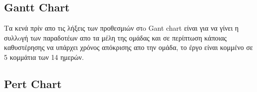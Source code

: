 \documentclass{article}
\begin{document}
\subsection{Gantt Chart} %
Τα κενά πρίν απο τις λήξεις των προθεσμιών στo Gant chart είναι για να γίνει η συλλoγή των παραδοτέων απο τα μέλη της ομάδας και σε περίπτωση κάποιας καθυστέρησης να υπάρχει χρόνος απόκρισης απο την ομάδα, το έργο είναι κομμένο σε 5 κομμάτια των 14 ημερών.
\begin{center}
\end{center}

\subsection{Pert Chart}
\end{document}

